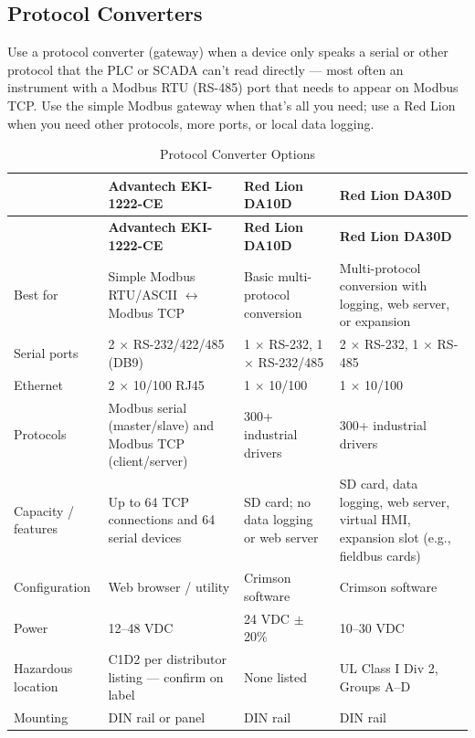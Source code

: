 \subsection{Protocol Converters}\label{sec:protocol-converters}
Use a protocol converter (gateway) when a device only speaks a serial or other protocol that the PLC or SCADA can't read directly --- most often an instrument with a Modbus RTU (RS-485) port that needs to appear on Modbus TCP. Use the simple Modbus gateway when that's all you need; use a Red Lion when you need other protocols, more ports, or local data logging.

\begin{small}
\setlength{\tabcolsep}{4pt}
\begin{longtable}{@{}P{2.9cm}P{3.6cm}P{3.6cm}P{3.6cm}@{}}
\caption{Protocol Converter Options}\label{tab:protocol-converters} \\
\toprule
{} & \textbf{Advantech EKI-1222-CE} & \textbf{Red Lion DA10D} & \textbf{Red Lion DA30D} \\
\midrule
\endfirsthead
\toprule
{} & \textbf{Advantech EKI-1222-CE} & \textbf{Red Lion DA10D} & \textbf{Red Lion DA30D} \\
\midrule
\endhead
Best for & Simple Modbus RTU/ASCII $\leftrightarrow$ Modbus TCP & Basic multi-protocol conversion & Multi-protocol conversion with logging, web server, or expansion \\
Serial ports & 2 $\times$ RS-232/422/485 (DB9) & 1 $\times$ RS-232, 1 $\times$ RS-232/485 & 2 $\times$ RS-232, 1 $\times$ RS-485 \\
Ethernet & 2 $\times$ 10/100 RJ45 & 1 $\times$ 10/100 & 1 $\times$ 10/100 \\
Protocols & Modbus serial (master/slave) and Modbus TCP (client/server) & 300+ industrial drivers & 300+ industrial drivers \\
Capacity / features & Up to 64 TCP connections and 64 serial devices & SD card; no data logging or web server & SD card, data logging, web server, virtual HMI, expansion slot (e.g., fieldbus cards) \\
Configuration & Web browser / utility & Crimson software & Crimson software \\
Power & 12--48 VDC & 24 VDC $\pm$20\% & 10--30 VDC \\
Hazardous location & C1D2 per distributor listing --- confirm on label & None listed & UL Class I Div 2, Groups A--D \\
Mounting & DIN rail or panel & DIN rail & DIN rail \\

\end{longtable}
\end{small}

